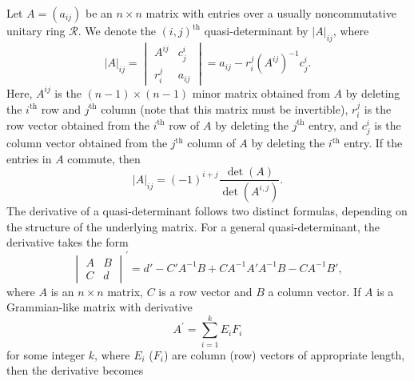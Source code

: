 \documentclass[11p,reqno]{amsart}
\numberwithin{equation}{section}
\numberwithin{equation}{section}
\begin{document}
Let $A = (a_{ij})$ be an $n \times n$ matrix with entries over a usually noncommutative unitary ring $\mathcal{R}$. We denote the $(i, j)^{\text{th}}$ quasi-determinant by $\left| A \right|_{ij}$, where
\begin{equation} \nonumber
    \left| A \right|_{ij} = \begin{vmatrix}
        A^{ij} & c_j^i \\
        r_i^j & \boxed{a_{ij}}
        \end{vmatrix} = a_{ij} - r_i^j (A^{ij})^{-1} c_j^i.
\end{equation}
Here, $A^{ij}$ is the $(n-1) \times (n-1)$ minor matrix obtained from $A$ by deleting the $i^{\text{th}}$ row and $j^{\text{th}}$ column (note that this matrix must be invertible), $r_i^j$ is the row vector obtained from the $i^{\text{th}}$ row of $A$ by deleting the $j^{\text{th}}$ entry, and $c_j^i$ is the column vector obtained from the $j^{\text{th}}$ column of $A$ by deleting the $i^{\text{th}}$ entry. If the entries in $A$ commute, then
\begin{equation} \nonumber
    \left| A \right|_{ij} = (-1)^{i+j} \frac{\det(A)}{\det(A^{i,j})}.
\end{equation}
The derivative of a quasi-determinant follows two distinct formulas, depending on the structure of the underlying matrix. For a general quasi-determinant, the derivative takes the form
\begin{equation} \nonumber
    \begin{vmatrix}
        A & B \\
        C & \boxed{d}
    \end{vmatrix}^{\prime} = d' - C'A^{-1}B + CA^{-1}A'A^{-1}B - CA^{-1}B',
\end{equation}
where $A$ is an $n \times n$ matrix, $C$ is a row vector and $B$ a column vector. If $A$ is a Grammian-like matrix with derivative
\begin{equation} \nonumber
    A^{\prime} = \sum_{i=1}^k E_i F_i
\end{equation}
for some integer $k$, where $E_i$ ($F_i$) are column (row) vectors of appropriate length, then the derivative becomes
\end{document}
